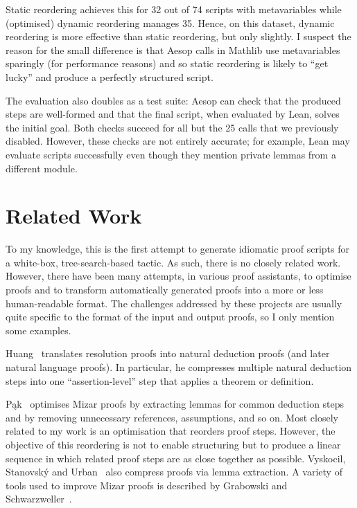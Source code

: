 \documentclass[sigplan,10pt,anonymous,review]{acmart}
\begin{document}
Static reordering achieves this for 32 out of 74 scripts with metavariables while (optimised) dynamic reordering manages 35.
Hence, on this dataset, dynamic reordering is more effective than static reordering, but only slightly.
I suspect the reason for the small difference is that Aesop calls in Mathlib use metavariables sparingly (for performance reasons) and so static reordering is likely to \enquote{get lucky} and produce a perfectly structured script.

\medskip

The evaluation also doubles as a test suite: Aesop can check that the produced steps are well-formed and that the final script, when evaluated by Lean, solves the initial goal.
Both checks succeed for all but the 25 calls that we previously disabled.
However, these checks are not entirely accurate; for example, Lean may evaluate scripts successfully even though they mention private lemmas from a different module.

\section{Related Work}%
\label{sec:related}

To my knowledge, this is the first attempt to generate idiomatic proof scripts for a white-box, tree-search-based tactic.
As such, there is no closely related work.
However, there have been many attempts, in various proof assistants, to optimise proofs and to transform automatically generated proofs into a more or less human-readable format.
The challenges addressed by these projects are usually quite specific to the format of the input and output proofs, so I only mention some examples.

Huang~\cite{Huang1989,Huang1994,Huang1996} translates resolution proofs into natural deduction proofs (and later natural language proofs).
In particular, he compresses multiple natural deduction steps into one \enquote{assertion-level} step that applies a theorem or definition.

Pąk~\cite{Pak2015,Pak2014a,Pak2014b,Pak2013,Pak2010} optimises Mizar proofs by extracting lemmas for common deduction steps and by removing unnecessary references, assumptions, and so on.
Most closely related to my work is an optimisation that reorders proof steps.
However, the objective of this reordering is not to enable structuring but to produce a linear sequence in which related proof steps are as close together as possible.
Vyskocil, Stanovský and Urban~\cite{Vyskovil2010} also compress proofs via lemma extraction.
A variety of tools used to improve Mizar proofs is described by Grabowski and Schwarzweller~\cite{Grabowski2009}.
\end{document}
